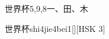 \begin{entry}{世界杯}{5,9,8}{⼀、⽥、⽊}
  \begin{phonetics}{世界杯}{shi4jie4bei1}[][HSK 3]
  \end{phonetics}
\end{entry}
